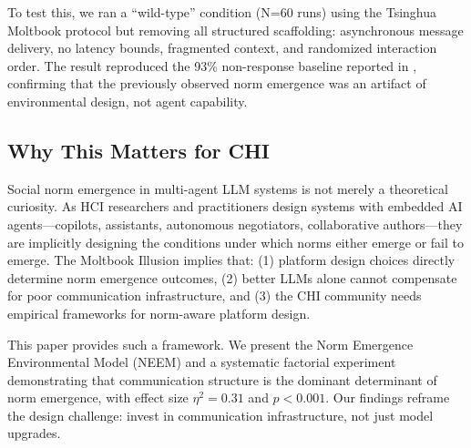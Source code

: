 To test this, we ran a ``wild-type'' condition (N=60 runs) using the Tsinghua Moltbook protocol but removing all structured scaffolding: asynchronous message delivery, no latency bounds, fragmented context, and randomized interaction order. The result reproduced the 93\% non-response baseline reported in \citep{li2026tsinghua}, confirming that the previously observed norm emergence was an artifact of environmental design, not agent capability.

\subsection{Why This Matters for CHI}

Social norm emergence in multi-agent LLM systems is not merely a theoretical curiosity. As HCI researchers and practitioners design systems with embedded AI agents—copilots, assistants, autonomous negotiators, collaborative authors—they are implicitly designing the conditions under which norms either emerge or fail to emerge. The Moltbook Illusion implies that: (1) platform design choices directly determine norm emergence outcomes, (2) better LLMs alone cannot compensate for poor communication infrastructure, and (3) the CHI community needs empirical frameworks for norm-aware platform design.

This paper provides such a framework. We present the Norm Emergence Environmental Model (NEEM) and a systematic factorial experiment demonstrating that communication structure is the dominant determinant of norm emergence, with effect size $\eta^2=0.31$ and $p<0.001$. Our findings reframe the design challenge: invest in communication infrastructure, not just model upgrades.